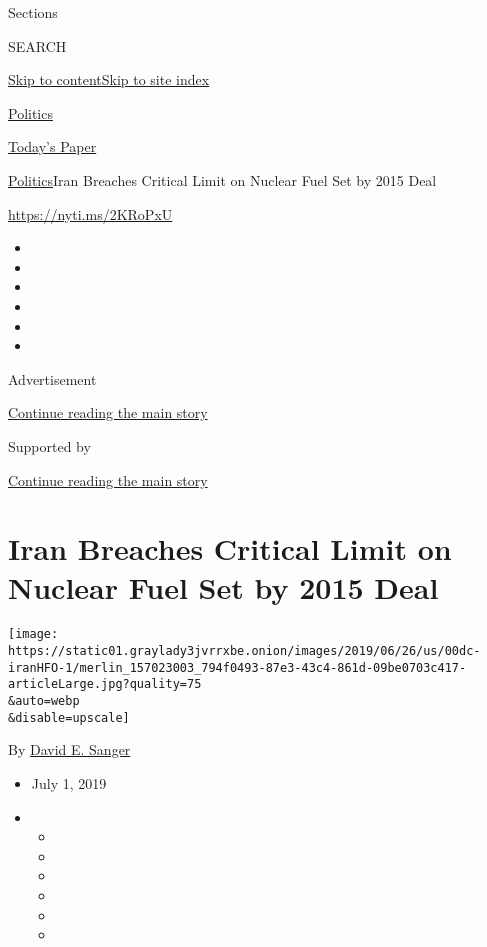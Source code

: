 Sections

SEARCH

\protect\hyperlink{site-content}{Skip to
content}\protect\hyperlink{site-index}{Skip to site index}

\href{https://www.nytimes3xbfgragh.onion/section/politics}{Politics}

\href{https://myaccount.nytimes3xbfgragh.onion/auth/login?response_type=cookie\&client_id=vi}{}

\href{https://www.nytimes3xbfgragh.onion/section/todayspaper}{Today's
Paper}

\href{/section/politics}{Politics}\textbar{}Iran Breaches Critical Limit
on Nuclear Fuel Set by 2015 Deal

\url{https://nyti.ms/2KRoPxU}

\begin{itemize}
\item
\item
\item
\item
\item
\item
\end{itemize}

Advertisement

\protect\hyperlink{after-top}{Continue reading the main story}

Supported by

\protect\hyperlink{after-sponsor}{Continue reading the main story}

\hypertarget{iran-breaches-critical-limit-on-nuclear-fuel-set-by-2015-deal}{%
\section{Iran Breaches Critical Limit on Nuclear Fuel Set by 2015
Deal}\label{iran-breaches-critical-limit-on-nuclear-fuel-set-by-2015-deal}}

\texttt{[image: https://static01.graylady3jvrrxbe.onion/images/2019/06/26/us/00dc-iranHFO-1/merlin\_157023003\_794f0493-87e3-43c4-861d-09be0703c417-articleLarge.jpg?quality=75\\\&auto=webp\\\&disable=upscale]}

By \href{https://www.nytimes3xbfgragh.onion/by/david-e-sanger}{David E.
Sanger}

\begin{itemize}
\item
  July 1, 2019
\item
  \begin{itemize}
  \item
  \item
  \item
  \item
  \item
  \item
  \end{itemize}
\end{itemize}

